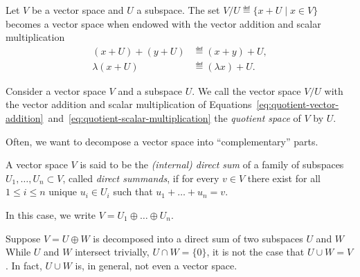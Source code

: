 \documentclass[a4paper, oneside, 12pt]{amsart}
\begin{document}
\begin{proposition}\label{prop:quotients-are-vs}
  Let \(V\) be a vector space and \(U\) a subspace.
  The set \(V/U \eqdef\{x+ U \mid x \in V\}\) becomes a vector space when endowed with the vector addition and scalar multiplication
  \begin{subequations}
    \begin{align}
      (x+U) + (y+ U) &\eqdef (x+y) +U, \label{eq:quotient-vector-addition} \\
      \lambda(x + U) &\eqdef (\lambda x) + U. \label{eq:quotient-scalar-multiplication}
    \end{align}
  \end{subequations}
\end{proposition}

\begin{definition}\label{def:quotient-vs}
  Consider a vector space \(V\) and a subspace \(U\).
  We call the vector space \(V/U\) with the vector addition and scalar multiplication of Equations~\eqref{eq:quotient-vector-addition}~and~\eqref{eq:quotient-scalar-multiplication} the \emph{quotient space} of \(V\) by \(U\).
\end{definition}

Often, we want to decompose a vector space into ``complementary'' parts.

\begin{definition}\label{def:direct-sum}
  A vector space \(V\) is said to be the \emph{(internal) direct sum} of a family of subspaces \(U_{1}, \dots , U_{n} \subset V\), called \emph{direct summands}, if for every \(v\in V\) there exist for all \(1 \leq i \leq n\) unique \(u_{i}\in U_{i}\)  such that \(u_{1}+ \dots + u_{n} = v\).

  In this case, we write \(V= U_{1} \oplus  \dots \oplus U_{n}\).
\end{definition}

Suppose \(V = U \oplus W\) is decomposed into a direct sum of two subspaces \(U\) and \(W\)
While  \(U\) and \(W\) intersect trivially, \ie \(U\cap W = \{0\}\), it is not the case that \(U \cup W = V\).
In fact, \(U \cup W\) is, in general, not even a vector space.
\end{document}
